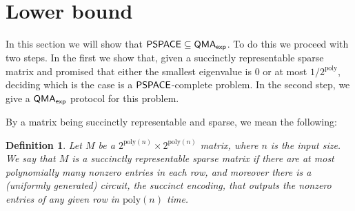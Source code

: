 \documentclass[11pt]{article}
\newtheorem{definition}{Definition}
\theoremstyle{definition}
\theoremstyle{remark}
\newcommand\PSPACE{{\sf{PSPACE}}}
\newcommand\QMAexp{{\sf{QMA}_{exp}}}
\newcommand{\poly}{\mathrm{poly}}
\begin{document}
\section{Lower bound}
In this section we will show that $\PSPACE\subseteq\QMAexp$.  To do this we proceed with two steps.  In the first we show that, given a succinctly representable sparse matrix and promised that either the smallest eigenvalue is 0 or at most $1/2^{\poly}$, deciding which is the case is a $\PSPACE$-complete problem.  In the second step, we give a $\QMAexp$ protocol for this problem.

By a matrix being succinctly representable and sparse, we mean the following:
\begin{definition}
Let $M$ be a $2^{\poly(n)} \times 2^{\poly(n)}$ matrix, where $n$ is the input size. We say that $M$ is a \emph{succinctly representable sparse} matrix if there are at most polynomially many nonzero entries in each row, and moreover there is a (uniformly generated) circuit, \emph{the succinct encoding}, that outputs the nonzero entries of any given row in $\poly(n)$ time.
\end{definition}
\end{document}
